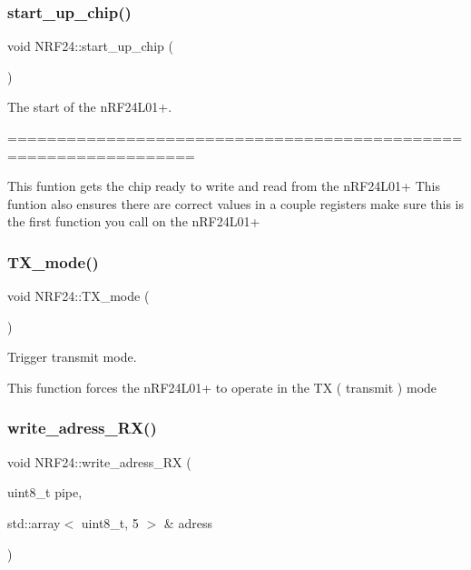 \subsubsection{\texorpdfstring{start\+\_\+up\+\_\+chip()}{start\_up\_chip()}}
{\footnotesize\ttfamily void N\+R\+F24\+::start\+\_\+up\+\_\+chip (\begin{DoxyParamCaption}{ }\end{DoxyParamCaption})}



The start of the n\+R\+F24\+L01+. 

=================================================================

This funtion gets the chip ready to write and read from the n\+R\+F24\+L01+ This funtion also ensures there are correct values in a couple registers make sure this is the first function you call on the n\+R\+F24\+L01+ \mbox{\label{classNRF24_aacd402b288514cc6c601b4041dab27d3}} 
\subsubsection{\texorpdfstring{T\+X\+\_\+mode()}{TX\_mode()}}
{\footnotesize\ttfamily void N\+R\+F24\+::\+T\+X\+\_\+mode (\begin{DoxyParamCaption}{ }\end{DoxyParamCaption})}



Trigger transmit mode. 

This function forces the n\+R\+F24\+L01+ to operate in the TX ( transmit ) mode \mbox{\label{classNRF24_acd69b21875e0573a52ecaf707d1364b0}} 
\subsubsection{\texorpdfstring{write\+\_\+adress\+\_\+\+R\+X()}{write\_adress\_RX()}}
{\footnotesize\ttfamily void N\+R\+F24\+::write\+\_\+adress\+\_\+\+RX (\begin{DoxyParamCaption}\item[{uint8\+\_\+t}]{pipe,  }\item[{std\+::array$<$ uint8\+\_\+t, 5 $>$ \&}]{adress }\end{DoxyParamCaption})}



